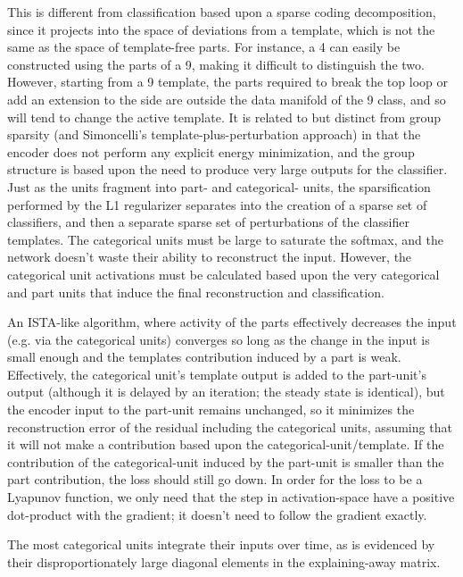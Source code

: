 This is different from classification based upon a sparse coding decomposition, since it projects into the space of deviations from a template, which is not the same as the space of template-free parts.  For instance, a 4 can easily be constructed using the parts of a 9, making it difficult to distinguish the two.  However, starting from a 9 template, the parts required to break the top loop or add an extension to the side are outside the data manifold of the 9 class, and so will tend to change the active template.  It is related to but distinct from group sparsity (and Simoncelli's template-plus-perturbation approach) in that the encoder does not perform any explicit energy minimization, and the group structure is based upon the need to produce very large outputs for the classifier.  Just as the units fragment into part- and categorical- units, the sparsification performed by the L1 regularizer separates into the creation of a sparse set of classifiers, and then a separate sparse set of perturbations of the classifier templates.  The categorical units must be large to saturate the softmax, and the network doesn't waste their ability to reconstruct the input.  However, the categorical unit activations must be calculated based upon the very categorical and part units that induce the final reconstruction and classification.

An ISTA-like algorithm, where activity of the parts effectively decreases the input (e.g. via the categorical units) converges so long as the change in the input is small enough and the templates contribution induced by a part is weak.  Effectively, the categorical unit's template output is added to the part-unit's output (although it is delayed by an iteration; the steady state is identical), but the encoder input to the part-unit remains unchanged, so it minimizes the reconstruction error of the residual including the categorical units, assuming that it will not make a contribution based upon the categorical-unit/template.  If the contribution of the categorical-unit induced by the part-unit is smaller than the part contribution, the loss should still go down.  In order for the loss to be a Lyapunov function, we only need that the step in activation-space have a positive dot-product with the gradient; it doesn't need to follow the gradient exactly.

The most categorical units integrate their inputs over time, as is evidenced by their disproportionately large diagonal elements in the explaining-away matrix.

